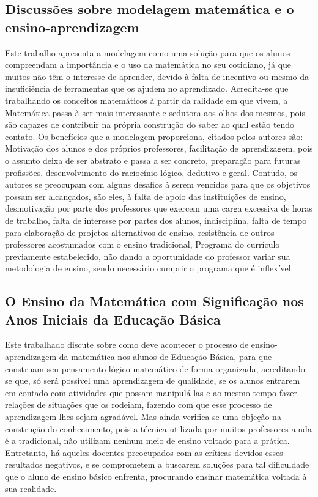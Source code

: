\documentclass[12pt,a4paper]{article}
\begin{document}
\subsection{Discussões sobre modelagem matemática e o ensino-aprendizagem}
Este trabalho apresenta a modelagem como uma solução para que os alunos compreendam a importância e o uso da matemática no seu cotidiano, já que muitos não têm o interesse de aprender, devido à falta de incentivo ou mesmo da insuficiência de ferramentas que os ajudem no aprendizado. Acredita-se que trabalhando os conceitos matemáticos à partir da ralidade em que vivem, a Matemática passa à ser mais interessante e sedutora aos olhos dos mesmos, pois são capazes de contribuir na própria construção do saber ao qual estão tendo contato. 
Os benefícios que a modelagem proporciona, citados pelos autores são: Motivação dos alunos e dos próprios professores, facilitação de aprendizagem, pois o assunto deixa de ser abstrato e passa a ser concreto, preparação para futuras profissões, desenvolvimento do raciocínio lógico, dedutivo e geral. 
Contudo, os autores se preocupam com alguns desafios à serem vencidos para que os objetivos possam ser alcançados, são eles, à falta de apoio das instituições de ensino, desmotivação por parte dos professores que exercem uma carga excessiva de horas de trabalho, falta de interesse por partes dos alunos, indisciplina, falta de tempo para elaboração de projetos alternativos de ensino, resistência de outros professores acostumados com o ensino tradicional, Programa do currículo previamente estabelecido, não dando a oportunidade do professor variar sua metodologia de ensino, sendo necessário cumprir o programa que é inflexível.

\subsection{O Ensino da Matemática com Significação nos Anos Iniciais da Educação Básica}
Este trabalhado discute sobre como deve acontecer o processo de ensino-aprendizagem da matemática nos alunos de Educação Básica, para que construam seu pensamento lógico-matemático de forma organizada, acreditando-se que, só será possível uma aprendizagem de qualidade, se os alunos entrarem em contado com atividades que possam manipulá-las e ao mesmo tempo fazer relações de situações que os rodeiam, fazendo com que esse processo de aprendizagem lhes sejam agradável. 
Mas ainda verifica-se uma objeção na construção do conhecimento, pois a técnica utilizada por muitos professores ainda é a tradicional, não utilizam nenhum meio de ensino voltado para a prática. Entretanto, há aqueles docentes preocupados com as críticas devidos esses resultados negativos, e se comprometem a buscarem soluções para tal dificuldade que o aluno de ensino básico enfrenta, procurando ensinar matemática voltada à sua realidade. 
\end{document}

